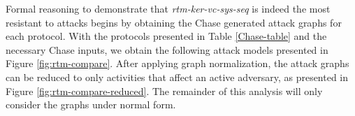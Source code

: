 \documentclass[runningheads]{llncs}
\theoremstyle{definition}
\begin{document}


Formal reasoning to demonstrate that \emph{rtm-ker-vc-sys-seq} is indeed the most resistant to attacks begins by obtaining the Chase generated attack graphs for each protocol. With the protocols presented in Table \ref{Chase-table} and the necessary Chase inputs, we obtain the following attack models presented in Figure \ref{fig:rtm-compare}. After applying graph normalization, the attack graphs can be reduced to only activities that affect an active adversary, as presented in Figure \ref{fig:rtm-compare-reduced}.  The remainder of this analysis will only consider the graphs under normal form. 
\end{document}
